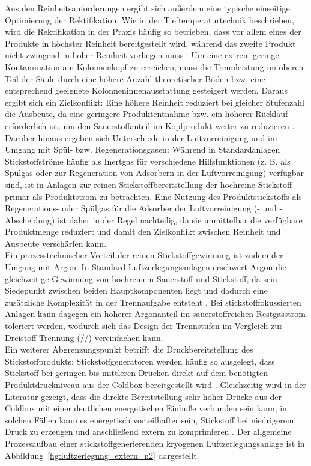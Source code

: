 Aus den Reinheitsanforderungen ergibt sich außerdem eine typische einseitige Optimierung der Rektifikation. Wie in der Tieftemperaturtechnik beschrieben, wird die Rektifikation in der Praxis häufig so betrieben, dass vor allem eines der Produkte in höchster Reinheit bereitgestellt wird, während das zweite Produkt nicht zwingend in hoher Reinheit vorliegen muss \cite{hausenTieftemperaturtechnik1985}. Um eine extrem geringe -Kontamination am Kolonnenkopf zu erreichen, muss die Trennleistung im oberen Teil der Säule durch eine höhere Anzahl theoretischer Böden bzw. eine entsprechend geeignete Kolonneninnenausstattung gesteigert werden. Daraus ergibt sich ein Zielkonflikt: Eine höhere Reinheit reduziert bei gleicher Stufenzahl die Ausbeute, da eine geringere Produktentnahme bzw. ein höherer Rücklauf erforderlich ist, um den Sauerstoffanteil im Kopfprodukt weiter zu reduzieren \cite{heinz-wolfgangharingAirGasesNitrogen2007}.\\
Darüber hinaus ergeben sich Unterschiede in der Luftvorreinigung und im Umgang mit Spül- bzw. Regenerationsgasen: Während in Standardanlagen Stickstoffströme häufig als Inertgas für verschiedene Hilfsfunktionen (z. B. als Spülgas oder zur Regeneration von Adsorbern in der Luftvorreinigung) verfügbar sind, ist in Anlagen zur reinen Stickstoffbereitstellung der hochreine Stickstoff primär als Produktstrom zu betrachten. Eine Nutzung des Produktstickstoffs als Regenerations- oder Spülgas für die Adsorber der Luftvorreinigung (- und -Abscheidung) ist daher in der Regel nachteilig, da sie unmittelbar die verfügbare Produktmenge reduziert und damit den Zielkonflikt zwischen Reinheit und Ausbeute verschärfen kann. \\
Ein prozesstechnischer Vorteil der reinen Stickstoffgewinnung ist zudem der Umgang mit Argon. In Standard-Luftzerlegungsanlagen erschwert Argon die gleichzeitige Gewinnung von hochreinem Sauerstoff und Stickstoff, da sein Siedepunkt zwischen beiden Hauptkomponenten liegt und dadurch eine zusätzliche Komplexität in der Trennaufgabe entsteht \cite{hausenTieftemperaturtechnik1985}. Bei stickstofffokussierten Anlagen kann dagegen ein höherer Argonanteil im sauerstoffreichen Restgasstrom toleriert werden, wodurch sich das Design der Trennstufen im Vergleich zur Dreistoff-Trennung (//) vereinfachen kann.\\
Ein weiterer Abgrenzungspunkt betrifft die Druckbereitstellung des Stickstoffprodukts: Stickstoffgeneratoren werden häufig so ausgelegt, dass Stickstoff bei geringen bis mittleren Drücken direkt auf dem benötigten Produktdruckniveau aus der Coldbox bereitgestellt wird \cite{agrawalProductionMediumPressure1991}. Gleichzeitig wird in der Literatur gezeigt, dass die direkte Bereitstellung sehr hoher Drücke aus der Coldbox mit einer deutlichen energetischen Einbuße verbunden sein kann; in solchen Fällen kann es energetisch vorteilhafter sein, Stickstoff bei niedrigerem Druck zu erzeugen und anschließend extern zu komprimieren \cite{agrawalProductionMediumPressure1991}. Der allgemeine Prozessaufbau einer stickstoffgenerierenden kryogenen Luftzerlegungsanlage ist in Abbildung~\ref{fig:luftzerlegung_extern_n2} dargestellt.\\
